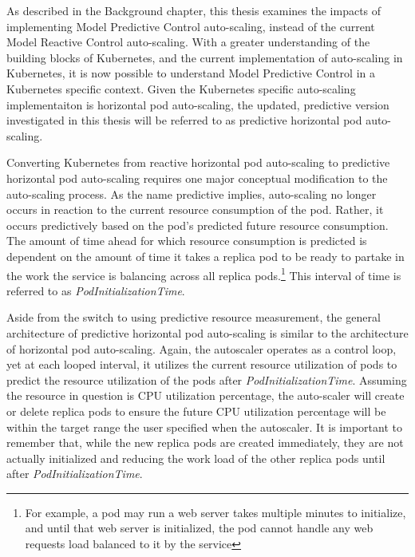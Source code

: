 As described in the Background chapter, this thesis examines the impacts of
implementing Model Predictive Control auto-scaling, instead of the current Model Reactive
Control auto-scaling. With a greater understanding of the building blocks of
Kubernetes, and the current implementation of auto-scaling in Kubernetes, it is
now possible to understand Model Predictive Control in a Kubernetes specific
context. Given the Kubernetes specific auto-scaling implementaiton is horizontal
pod auto-scaling, the updated, predictive version investigated in this thesis
will be referred to as predictive horizontal pod auto-scaling.

Converting Kubernetes from reactive horizontal pod auto-scaling to predictive
horizontal pod auto-scaling requires one major conceptual modification to the
auto-scaling process. As the name predictive implies, auto-scaling no longer
occurs in reaction to the current resource consumption of the pod. Rather, it occurs
predictively based on the pod's predicted future resource consumption. The
amount of time ahead for which resource consumption is predicted is dependent on
the amount of time it takes a replica pod to be ready to partake in the work the
service is balancing across all replica pods.\footnote{For example, a pod may
run a web server takes multiple minutes to initialize, and until that web server
is initialized, the pod cannot handle any web requests load balanced to it by
the service} This interval of time is referred to as \textit{PodInitializationTime}.

Aside from the switch to using predictive resource measurement, the
general architecture of predictive horizontal pod auto-scaling is similar to the
architecture of horizontal pod auto-scaling. Again, the autoscaler operates as a
control loop, yet at each looped interval, it utilizes the current resource
utilization of pods to predict the resource utilization of the pods after
\textit{PodInitializationTime}. Assuming the resource in question is CPU
utilization percentage, the auto-scaler will create or delete replica pods
to ensure the future CPU utilization percentage will be within the target range
the user specified when the autoscaler. It is important to remember that, while
the new replica pods are created immediately, they are not actually initialized
and reducing the work load of the other replica pods until after
\textit{PodInitializationTime}.
